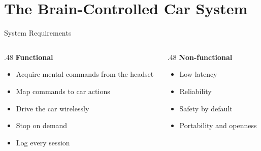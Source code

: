 \documentclass[aspectratio=169,11pt]{beamer}
\begin{document}
\section{The Brain-Controlled Car System}

\begin{frame}{System Requirements}
  \begin{columns}[T]
    \begin{column}{.48\textwidth}
      \textbf{Functional}\par\smallskip
      \begin{itemize}
        \item[\color{accent}\bfseries FR1] Acquire mental commands from the headset
        \item[\color{accent}\bfseries FR2] Map commands to car actions
        \item[\color{accent}\bfseries FR3] Drive the car wirelessly
        \item[\color{accent}\bfseries FR4] Stop on demand
        \item[\color{accent}\bfseries FR5] Log every session
      \end{itemize}
    \end{column}
    \begin{column}{.48\textwidth}
      \textbf{Non-functional}\par\smallskip
      \begin{itemize}
        \item[\color{accent}\bfseries NFR1] Low latency
        \item[\color{accent}\bfseries NFR2] Reliability
        \item[\color{accent}\bfseries NFR3] Safety by default
        \item[\color{accent}\bfseries NFR4] Portability and openness
      \end{itemize}
    \end{column}
  \end{columns}
\end{frame}
\end{document}
